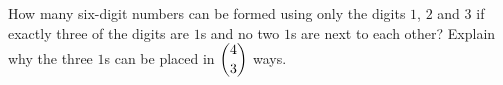 How many six-digit numbers can be formed using only the digits $1$, $2$ and $3$ if exactly three of the digits are $1$s and no two $1$s are next to each other? Explain why the three $1$s can be placed in $\dbinom43$ ways.

